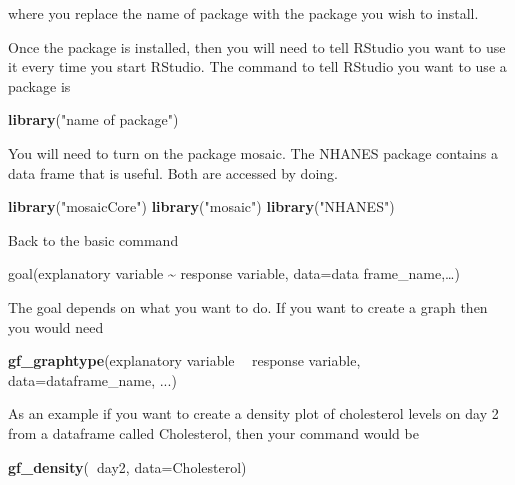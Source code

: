 \documentclass[
]{book}
\newenvironment{Shaded}{\begin{snugshade}}{\end{snugshade}}
\newcommand{\DataTypeTok}[1]{\textcolor[rgb]{0.13,0.29,0.53}{#1}}
\newcommand{\KeywordTok}[1]{\textcolor[rgb]{0.13,0.29,0.53}{\textbf{#1}}}
\newcommand{\NormalTok}[1]{#1}
\newcommand{\OperatorTok}[1]{\textcolor[rgb]{0.81,0.36,0.00}{\textbf{#1}}}
\newcommand{\StringTok}[1]{\textcolor[rgb]{0.31,0.60,0.02}{#1}}
\begin{document}
where you replace the name of package with the package you wish to install.

Once the package is installed, then you will need to tell RStudio you want to use it every time you start RStudio. The command to tell RStudio you want to use a package is

\begin{Shaded}
\begin{Highlighting}[]
\KeywordTok{library}\NormalTok{(}\StringTok{"name of package"}\NormalTok{)}
\end{Highlighting}
\end{Shaded}

You will need to turn on the package mosaic. The NHANES package contains a data frame that is useful. Both are accessed by doing.

\begin{Shaded}
\begin{Highlighting}[]
\KeywordTok{library}\NormalTok{(}\StringTok{"mosaicCore"}\NormalTok{)}
\KeywordTok{library}\NormalTok{(}\StringTok{"mosaic"}\NormalTok{)}
\KeywordTok{library}\NormalTok{(}\StringTok{"NHANES"}\NormalTok{)}
\end{Highlighting}
\end{Shaded}

Back to the basic command

goal(explanatory variable \textasciitilde{} response variable, data=data frame\_name,\ldots)

The goal depends on what you want to do. If you want to create a graph then you would need

\begin{Shaded}
\begin{Highlighting}[]
\KeywordTok{gf_graphtype}\NormalTok{(explanatory variable }\OperatorTok{~}\StringTok{ }
\NormalTok{response variable, }\DataTypeTok{data=}\NormalTok{dataframe_name, ...)}
\end{Highlighting}
\end{Shaded}

As an example if you want to create a density plot of cholesterol levels on day 2 from a dataframe called Cholesterol, then your command would be

\begin{Shaded}
\begin{Highlighting}[]
\KeywordTok{gf_density}\NormalTok{(}\OperatorTok{~}\NormalTok{day2, }\DataTypeTok{data=}\NormalTok{Cholesterol)}
\end{Highlighting}
\end{Shaded}
\end{document}
